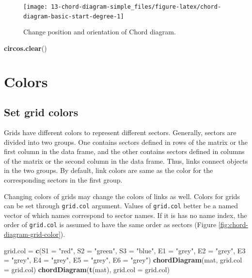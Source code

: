 \documentclass[]{book}
\newenvironment{Shaded}{\begin{snugshade}}{\end{snugshade}}
\newcommand{\KeywordTok}[1]{\textcolor[rgb]{0.13,0.29,0.53}{\textbf{#1}}}
\newcommand{\DataTypeTok}[1]{\textcolor[rgb]{0.13,0.29,0.53}{#1}}
\newcommand{\StringTok}[1]{\textcolor[rgb]{0.31,0.60,0.02}{#1}}
\newcommand{\NormalTok}[1]{#1}
\theoremstyle{definition}
\theoremstyle{definition}
\theoremstyle{remark}
\begin{document}
\begin{figure}

{\centering \texttt{[image: 13-chord-diagram-simple\_files/figure-latex/chord-diagram-basic-start-degree-1]} 

}

\caption{Change position and orientation of Chord diagram.}\label{fig:chord-diagram-basic-start-degree}
\end{figure}

\begin{Shaded}
\begin{Highlighting}[]
\KeywordTok{circos.clear}\NormalTok{()}
\end{Highlighting}
\end{Shaded}

\section{Colors}\label{chord-diagram-colors}

\subsection{Set grid colors}\label{set-grid-colors}

Grids have different colors to represent different sectors. Generally,
sectors are divided into two groups. One contains sectors defined in
rows of the matrix or the first column in the data frame, and the other
contains sectors defined in columns of the matrix or the second column
in the data frame. Thus, links connect objects in the two groups. By
default, link colors are same as the color for the corresponding sectors
in the first group.

Changing colors of grids may change the colors of links as well. Colors
for grids can be set through \texttt{grid.col} argument. Values of
\texttt{grid.col} better be a named vector of which names correspond to
sector names. If it is has no name index, the order of \texttt{grid.col}
is assumed to have the same order as sectors (Figure
\ref{fig:chord-diagram-grid-color}).

\begin{Shaded}
\begin{Highlighting}[]
\NormalTok{grid.col =}\StringTok{ }\KeywordTok{c}\NormalTok{(}\DataTypeTok{S1 =} \StringTok{"red"}\NormalTok{, }\DataTypeTok{S2 =} \StringTok{"green"}\NormalTok{, }\DataTypeTok{S3 =} \StringTok{"blue"}\NormalTok{,}
    \DataTypeTok{E1 =} \StringTok{"grey"}\NormalTok{, }\DataTypeTok{E2 =} \StringTok{"grey"}\NormalTok{, }\DataTypeTok{E3 =} \StringTok{"grey"}\NormalTok{, }\DataTypeTok{E4 =} \StringTok{"grey"}\NormalTok{, }\DataTypeTok{E5 =} \StringTok{"grey"}\NormalTok{, }\DataTypeTok{E6 =} \StringTok{"grey"}\NormalTok{)}
\KeywordTok{chordDiagram}\NormalTok{(mat, }\DataTypeTok{grid.col =}\NormalTok{ grid.col)}
\KeywordTok{chordDiagram}\NormalTok{(}\KeywordTok{t}\NormalTok{(mat), }\DataTypeTok{grid.col =}\NormalTok{ grid.col)}
\end{Highlighting}
\end{Shaded}
\end{document}
